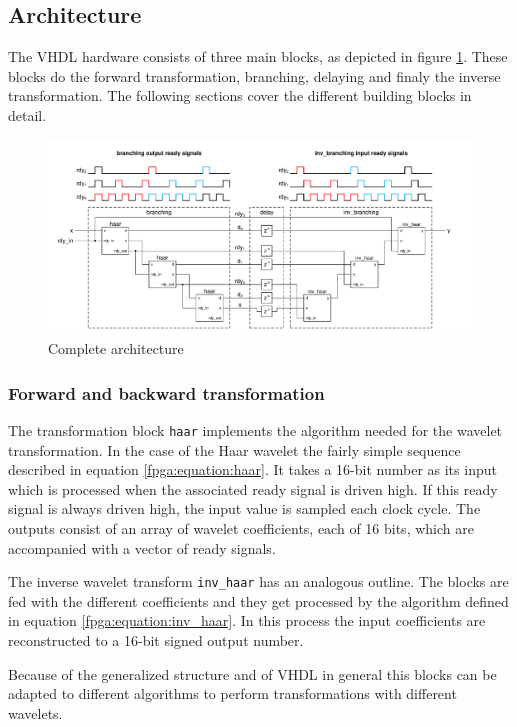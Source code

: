 \begin{refsection}
\subsection{Architecture}
The VHDL hardware consists of three main blocks, as depicted in figure \ref{fpga:fig:architecture}.
These blocks do the forward transformation, branching, delaying and finaly the inverse transformation.
The following sections cover the different building blocks in detail. 
\begin{figure}
	\centering
	\includegraphics[width=\textwidth]{./images/main_delay.pdf}
	\caption{Complete architecture \label{fpga:fig:architecture}}
\end{figure}
\subsubsection{Forward and backward transformation}

The transformation block \texttt{haar} implements the algorithm needed for the wavelet transformation.
In the case of the Haar wavelet the fairly simple sequence described in equation \ref{fpga:equation:haar}.
It takes a 16-bit number as its input which is processed when the associated ready signal is driven high.
If this ready signal is always driven high, the input value is sampled each clock cycle.
The outputs consist of an array of wavelet coefficients, each of 16 bits, which are accompanied with a vector of ready signals. 

The inverse wavelet transform \texttt{inv\_haar} has an analogous outline.
The blocks are fed with the different coefficients and they get processed by the algorithm defined in equation \ref{fpga:equation:inv_haar}.
In this process the input coefficients are reconstructed to a 16-bit signed output number.%

Because of the generalized structure and of VHDL in general this blocks can be adapted to different algorithms to perform transformations with different wavelets.




\end{refsection}
